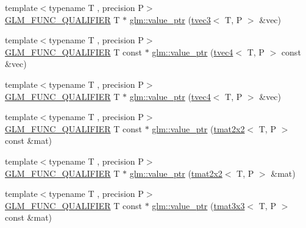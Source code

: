 \begin{DoxyCompactItemize}
\item 
{\footnotesize template$<$typename T , precision P$>$ }\\\mbox{\hyperlink{setup_8hpp_a33fdea6f91c5f834105f7415e2a64407}{G\+L\+M\+\_\+\+F\+U\+N\+C\+\_\+\+Q\+U\+A\+L\+I\+F\+I\+ER}} T $\ast$ \mbox{\hyperlink{group__gtc__type__ptr_gab2832ef9f1d2571fab5c7ae661e11e75}{glm\+::value\+\_\+ptr}} (\mbox{\hyperlink{structglm_1_1tvec3}{tvec3}}$<$ T, P $>$ \&vec)
\item 
{\footnotesize template$<$typename T , precision P$>$ }\\\mbox{\hyperlink{setup_8hpp_a33fdea6f91c5f834105f7415e2a64407}{G\+L\+M\+\_\+\+F\+U\+N\+C\+\_\+\+Q\+U\+A\+L\+I\+F\+I\+ER}} T const  $\ast$ \mbox{\hyperlink{group__gtc__type__ptr_gaf641bc0e28d4b274826b9afed315d310}{glm\+::value\+\_\+ptr}} (\mbox{\hyperlink{structglm_1_1tvec4}{tvec4}}$<$ T, P $>$ const \&vec)
\item 
{\footnotesize template$<$typename T , precision P$>$ }\\\mbox{\hyperlink{setup_8hpp_a33fdea6f91c5f834105f7415e2a64407}{G\+L\+M\+\_\+\+F\+U\+N\+C\+\_\+\+Q\+U\+A\+L\+I\+F\+I\+ER}} T $\ast$ \mbox{\hyperlink{group__gtc__type__ptr_ga4c19763f3c5991b9dc88a3ffdd9ea6cd}{glm\+::value\+\_\+ptr}} (\mbox{\hyperlink{structglm_1_1tvec4}{tvec4}}$<$ T, P $>$ \&vec)
\item 
{\footnotesize template$<$typename T , precision P$>$ }\\\mbox{\hyperlink{setup_8hpp_a33fdea6f91c5f834105f7415e2a64407}{G\+L\+M\+\_\+\+F\+U\+N\+C\+\_\+\+Q\+U\+A\+L\+I\+F\+I\+ER}} T const  $\ast$ \mbox{\hyperlink{group__gtc__type__ptr_ga2d709523aa0beb0a42433f80c9d07718}{glm\+::value\+\_\+ptr}} (\mbox{\hyperlink{structglm_1_1tmat2x2}{tmat2x2}}$<$ T, P $>$ const \&mat)
\item 
{\footnotesize template$<$typename T , precision P$>$ }\\\mbox{\hyperlink{setup_8hpp_a33fdea6f91c5f834105f7415e2a64407}{G\+L\+M\+\_\+\+F\+U\+N\+C\+\_\+\+Q\+U\+A\+L\+I\+F\+I\+ER}} T $\ast$ \mbox{\hyperlink{group__gtc__type__ptr_gac7256e14328e818e61276fa5e6176b9d}{glm\+::value\+\_\+ptr}} (\mbox{\hyperlink{structglm_1_1tmat2x2}{tmat2x2}}$<$ T, P $>$ \&mat)
\item 
{\footnotesize template$<$typename T , precision P$>$ }\\\mbox{\hyperlink{setup_8hpp_a33fdea6f91c5f834105f7415e2a64407}{G\+L\+M\+\_\+\+F\+U\+N\+C\+\_\+\+Q\+U\+A\+L\+I\+F\+I\+ER}} T const  $\ast$ \mbox{\hyperlink{group__gtc__type__ptr_ga0fd20ac385befba86cf2bbf836728bc2}{glm\+::value\+\_\+ptr}} (\mbox{\hyperlink{structglm_1_1tmat3x3}{tmat3x3}}$<$ T, P $>$ const \&mat)

\end{DoxyCompactItemize}

